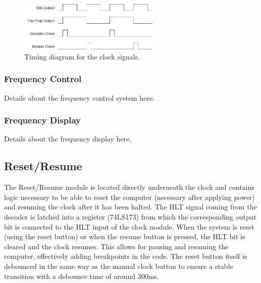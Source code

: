 \begin{figure}[H]
  \centering
  \includegraphics[width=0.6\textwidth]{img/clocktiming}
  \caption{Timing diagram for the clock signals.}
  \label{fig:clocktiming}
\end{figure}

\subsubsection{Frequency Control}
Details about the frequency control system here.

\subsubsection{Frequency Display}
Details about the frequency display here.


\subsection{Reset/Resume} \label{sec:resetresume}
The Reset/Resume module is located directly underneath the clock and contains logic necessary to be able to reset the computer (necessary after applying power) and resuming the clock after it has been halted. The HLT signal coming from the decoder is latched into a register (74LS173) from which the corresponding output bit is connected to the HLT input of the clock module. When the system is reset (using the reset button) or when the resume button is pressed, the HLT bit is cleared and the clock resumes. This allows for pausing and resuming the computer, effectively adding breakpoints in the code. The reset button itself is debounced in the same way as the manual clock button to ensure a stable transition with a debounce time of around 300ms.

